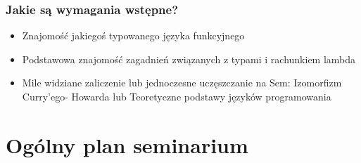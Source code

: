 \documentclass{beamer}
\begin{document}
\begin{frame}

\frametitle{Jakie są wymagania wstępne?}

\begin{itemize}
\item Znajomość jakiegoś typowanego języka funkcyjnego
\item Podstawowa znajomość zagadnień związanych z typami i rachunkiem lambda 
\item Mile widziane zaliczenie lub jednoczesne uczęszczanie na Sem: Izomorfizm Curry'ego-
Howarda lub Teoretyczne podstawy języków programowania
\end{itemize}

\end{frame}


\section{Ogólny plan seminarium}
\end{document}
